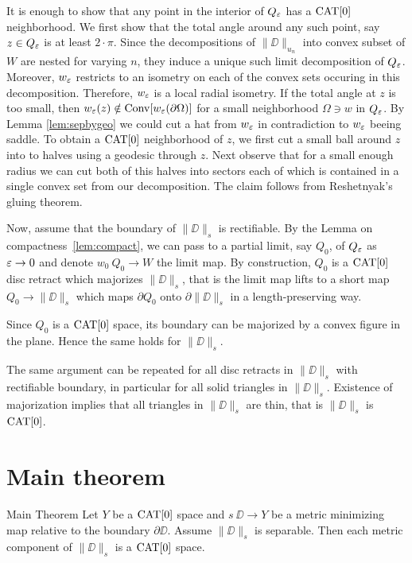 \documentclass{article}
\begin{document}
It is enough to show that any point in the interior of $Q_\varepsilon$ has a $\mathop{\rm CAT}\nolimits[0]$ neighborhood.
We first show that the total angle around any such point, say $z\in Q_\varepsilon$ is at least $2\cdot\pi$.
Since the decompositions of $\|\DD\|_{u_n}$ into convex subset of $W$ are nested for varying $n$, they
induce a unique such limit decomposition of $Q_\varepsilon$. Moreover, $w_\varepsilon$ restricts to an isometry on each 
of the convex sets occuring in this decomposition. Therefore, $w_\varepsilon$ is a local radial isometry.
If the total angle at $z$ is too small, then $w_\varepsilon(z)\notin\mathop{\rm Conv}\nolimits [w_\varepsilon (\partial\Omega)]$
for a small neighborhood $\Omega\ni w$ in $Q_\varepsilon$. 
By Lemma \ref{lem:sepbygeo} we could cut a hat from $w_\varepsilon$
in contradiction to $w_\varepsilon$ beeing saddle.
To obtain a $\mathop{\rm CAT}\nolimits[0]$ neighborhood of $z$, we first cut a small ball around $z$ into to halves using a geodesic through $z$.
Next observe that for a small enough radius we can cut both of this halves into sectors each of which is contained in a single convex set
from our decomposition. The claim follows from Reshetnyak's gluing theorem.
\qeds


Now, assume that the boundary of $\|\DD\|_s$ is rectifiable.
By the Lemma on compactness~\ref{lem:compact},
we can pass to a partial limit, say $Q_0$, of $Q_\varepsilon$ as $\varepsilon\to 0$ and denote $w_0\:Q_0\to W$ the limit map.
By construction, $Q_0$ is a $\mathop{\rm CAT}\nolimits[0]$ disc retract which majorizes $\|\DD\|_s$,
that is the limit map lifts to a short map $Q_0\to \|\DD\|_s$ which maps $\partial Q_0$ onto  $\partial \|\DD\|_s$ in a length-preserving way.

Since $Q_0$ is a $\mathop{\rm CAT}\nolimits[0]$ space, its boundary can be majorized by a convex figure in the plane.
Hence the same holds for $\|\DD\|_s$.

The same argument can be repeated for all disc retracts in $\|\DD\|_s$ with rectifiable boundary, in particular for all solid triangles in $\|\DD\|_s$.
Existence of majorization implies that all triangles in $\|\DD\|_s$ are thin, that is $\|\DD\|_s$ is $\mathop{\rm CAT}\nolimits[0]$.
\qeds

\section{Main theorem}

\begin{thm}{Main Theorem}\label{thm:main}
Let $Y$ be a $\mathop{\rm CAT}\nolimits[0]$ space 
and $s\:\DD\to Y$ be a metric minimizing map relative to the boundary $\partial\DD$.
Assume $\|\DD\|_s$  is separable. 
Then each metric component of $\|\DD\|_s$ is a $\mathop{\rm CAT}\nolimits[0]$ space. 
\end{thm}
\end{document}

